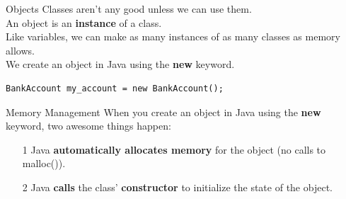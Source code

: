 \documentclass[aspectratio=169]{beamer}
\begin{document}
\begin{frame}[fragile]{Objects}
Classes aren't any good unless we can use them. \\
\vspace{0.5em}
An object is an \textbf{instance} of a class.   \\
\vspace{0.5em}
Like variables, we can make as many instances of as many classes as memory allows. \\
\vspace{0.5em}
We create an object in Java using the \textbf{new} keyword. \\
\vspace{0.5em}
\begin{Verbatim}
BankAccount my_account = new BankAccount();
\end{Verbatim}
\end{frame}



\begin{frame}[fragile]{Memory Management}
When you create an object in Java using the \textbf{new} keyword, two awesome things happen: \\
\begin{itemize}
\item[1] Java \textbf{automatically allocates memory} for the object (no calls to malloc()).
\item[2] Java \textbf{calls} the class' \textbf{constructor} to initialize the state of the object. \\
\end{itemize}
\end{frame}
\end{document}
